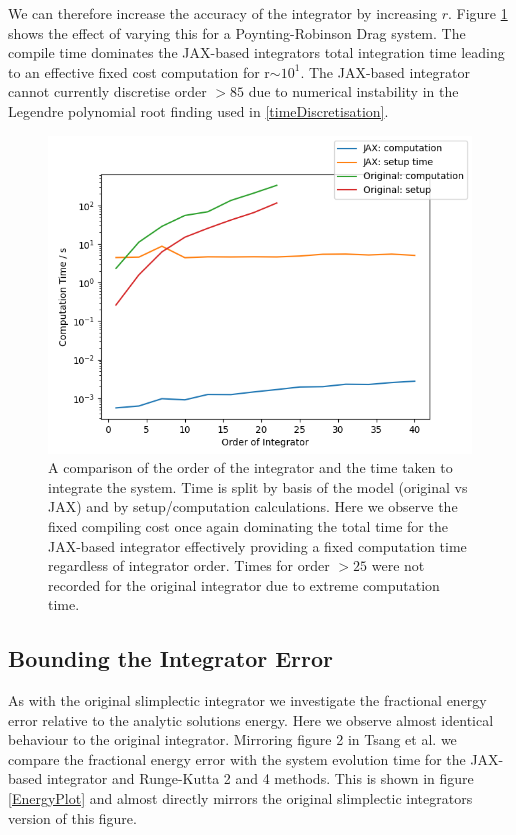 \documentclass[10pt]{iopart}
\begin{document}
We can therefore increase the accuracy of the integrator by increasing $r$. Figure \ref{rplot} shows the effect of varying this for a Poynting-Robinson Drag system. The compile time dominates the JAX-based integrators total integration time leading to an effective fixed cost computation for r$\sim10^1$. The JAX-based integrator cannot currently discretise order $>85$ due to numerical instability in the Legendre polynomial root finding used in \ref{timeDiscretisation}. 


\begin{figure}
	\label{rplot}
	\includegraphics[width=\columnwidth]{RPlot.jpg}
	\caption{A comparison of the order of the integrator and the time taken to integrate the system. Time is split by basis of the model (original vs JAX) and by setup/computation calculations. Here we observe the fixed compiling cost once again dominating the total time for the JAX-based integrator effectively providing a fixed computation time regardless of integrator order. Times for order $>25$ were not recorded for the original integrator due to extreme computation time.}
\end{figure}

\subsection{Bounding the Integrator Error}
As with the original slimplectic integrator we investigate the fractional energy error relative to the analytic solutions energy. Here we observe almost identical behaviour to the original integrator. Mirroring figure 2 in Tsang et al. \cite{Tsang_Slimplectic} we compare the fractional energy error with the system evolution time for the JAX-based integrator and Runge-Kutta 2 and 4 methods. This is shown in figure \ref{EnergyPlot} and almost directly mirrors the original slimplectic integrators version of this figure. 
\end{document}
